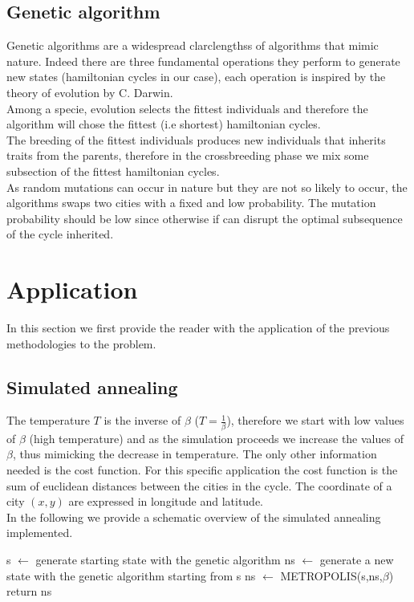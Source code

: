 \documentclass{article}
\begin{document}
\subsection{Genetic algorithm}
Genetic algorithms are a widespread clarclengthss of algorithms that mimic nature. Indeed there are three fundamental operations they perform to generate new states (hamiltonian cycles in our case), each operation is inspired by the theory of evolution by C. Darwin. \\
Among a specie, evolution selects the fittest individuals and therefore the algorithm will chose the fittest (i.e shortest) hamiltonian cycles. \\
The breeding of the fittest individuals produces new individuals that inherits traits from the parents, therefore in the crossbreeding phase we mix some subsection of the fittest hamiltonian cycles. \\
As random mutations can occur in nature but they are not so likely to occur, the algorithms swaps two cities with a fixed and low probability. The mutation probability should be low since otherwise if can disrupt the optimal subsequence of the cycle inherited. \\

\section{Application} 
In this section we first provide the reader with the application of the previous methodologies to the problem. 

\subsection{Simulated annealing}
The temperature $T$ is the inverse of $\beta$ ($T = \frac{1}{\beta}$), therefore we start with low values of $\beta$ (high temperature) and as the simulation proceeds we increase the values of $\beta$, thus mimicking the decrease in temperature.
The only other information needed is the cost function. For this specific application the cost function is the sum of euclidean distances between the cities in the cycle. The coordinate of a city $(x,y)$ are expressed in longitude and latitude.\\
In the following we provide a schematic overview of the simulated annealing implemented.

\begin{algorithm}[H]
    \begin{algorithmic}[1]
        \State s $\leftarrow$ generate starting state with the genetic algorithm
         	 \State ns $\leftarrow$ generate a new state with the genetic algorithm starting from s
         	\State ns $\leftarrow$ METROPOLIS(s,ns,$\beta$)
         	\EndFor
        \EndFor
        \State return ns
       \EndFunction
\end{algorithmic}
\end{algorithm}
\end{document}
